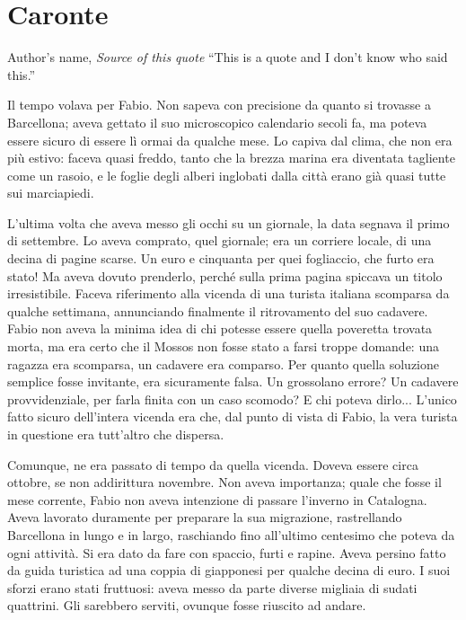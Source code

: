 \chapter{Caronte}

\begin{chapquote}{Author's name, \textit{Source of this quote}}
``This is a quote and I don't know who said this.''
\end{chapquote}


Il tempo volava per Fabio. Non sapeva con precisione da quanto si trovasse a Barcellona; aveva gettato il suo microscopico calendario secoli fa, ma poteva essere sicuro di essere lì ormai da qualche mese. Lo capiva dal clima, che non era più estivo: faceva quasi freddo, tanto che la brezza marina era diventata tagliente come un rasoio, e le foglie degli alberi inglobati dalla città erano già quasi tutte sui marciapiedi.

L'ultima volta che aveva messo gli occhi su un giornale, la data segnava il primo di settembre. Lo aveva comprato, quel giornale; era un corriere locale, di una decina di pagine scarse. Un euro e cinquanta per quei fogliaccio, che furto era stato! Ma aveva dovuto prenderlo, perché sulla prima pagina spiccava un titolo irresistibile. Faceva riferimento alla vicenda di una turista italiana scomparsa da qualche settimana, annunciando finalmente il ritrovamento del suo cadavere. Fabio non aveva la minima idea di chi potesse essere quella poveretta trovata morta, ma era certo che il Mossos non fosse stato a farsi troppe domande: una ragazza era scomparsa, un cadavere era comparso. Per quanto quella soluzione semplice fosse invitante, era sicuramente falsa. Un grossolano errore? Un cadavere provvidenziale, per farla finita con un caso scomodo? E chi poteva dirlo... L'unico fatto sicuro dell'intera vicenda era che, dal punto di vista di Fabio, la vera turista in questione era tutt'altro che dispersa.

Comunque, ne era passato di tempo da quella vicenda. Doveva essere circa ottobre, se non addirittura novembre. Non aveva importanza; quale che fosse il mese corrente, Fabio non aveva intenzione di passare l'inverno in Catalogna. Aveva lavorato duramente per preparare la sua migrazione, rastrellando Barcellona in lungo e in largo, raschiando fino all'ultimo centesimo che poteva da ogni attività. Si era dato da fare con spaccio, furti e rapine. Aveva persino fatto da guida turistica ad una coppia di giapponesi per qualche decina di euro. I suoi sforzi erano stati fruttuosi: aveva messo da parte diverse migliaia di sudati quattrini. Gli sarebbero serviti, ovunque fosse riuscito ad andare. 

